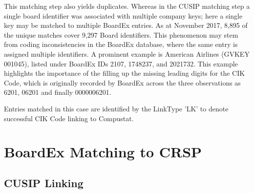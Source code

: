 \documentclass[12pt]{article}
\begin{document}
This matching step also yields duplicates.
Whereas in the CUSIP matching step a single board identifier was associated with multiple company keys; here a single key may be matched to multiple BoardEx entries.
As at November 2017, 8,895 of the unique matches cover 9,297 Board identifiers.
This phenomenon may stem from coding inconsistencies in the BoardEx database, where the same entry is assigned multiple identifiers.
A prominent example is American Airlines (GVKEY 001045), listed under BoardEx IDs 2107, 1748237, and 2021732.
This example highlights the importance of the filling up the missing leading digits for the CIK Code, which is originally recorded by BoardEx across the three observations as 6201, 06201 and finally 0000006201.

\begin{center}

\end{center}

Entries matched in this case are identified by the LinkType 'LK' to denote successful CIK Code linking to Compustat.

\begin{comment}
\subsection{Ticker Symbol Linking}\label{sec:TICmatch}

The third matching stage involves the same process as before and employs the original dataset for linking.
The company's ticker symbol is the third and last available identifier that can be matched between the BoardEx and Compustat databases.
As before, care is taken that ticker symbols are matched for the specific year, as it is customary for tickers to be reused and recycled over time.

Entries matched in this case are identified by the $Match\_TIC$ dummy to note successful identification.
The code includes methods to obtain summary statistics to inspect the success of a matching stage for each merging strategy.
\end{comment}

\section{BoardEx Matching to CRSP}\label{sec:BoardexCRSP}

\subsection{CUSIP Linking}\label{sec:CRSPCUSIPmatch}
\end{document}
